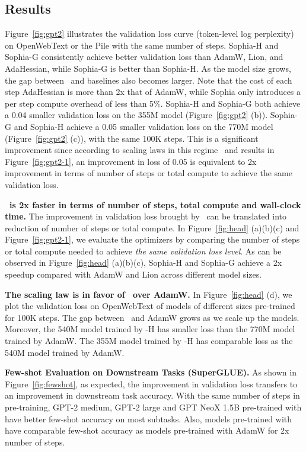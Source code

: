 \subsection{Results}\label{sec:results}

Figure~\ref{fig:gpt2} illustrates the validation loss curve (token-level log perplexity) on OpenWebText or the Pile with the same number of steps. Sophia-H and Sophia-G
consistently achieve better validation loss than AdamW, Lion, and AdaHessian, while Sophia-G is better than Sophia-H. As the model size grows, the gap between \ours~and baselines also becomes larger. Note that the cost of each step AdaHessian is more than 2x that of AdamW, while Sophia only introduces a per step compute overhead of less than 5$\%$. Sophia-H and Sophia-G both achieve a 0.04 smaller validation loss on the 355M model (Figure~\ref{fig:gpt2} (b)). Sophia-G and Sophia-H achieve a 0.05 smaller validation loss on the 770M model (Figure~\ref{fig:gpt2} (c)), with the same 100K steps. This is a significant improvement since according to scaling laws in this regime~\citep{kaplan2020scaling,hoffmann2022training} and results in Figure~\ref{fig:gpt2-1}, an improvement in loss of 0.05 is equivalent to 2x improvement in terms of number of steps or total compute to achieve the same validation loss. 

\textbf{\ours~is 2x faster in terms of number of steps, total compute and wall-clock time.} The improvement in validation loss brought by \ours~can be translated into reduction of number of steps or total compute. In Figure~\ref{fig:head} (a)(b)(c) and Figure~\ref{fig:gpt2-1}, we evaluate the optimizers by comparing the number of steps or total compute needed to achieve \textit{the same validation loss level}. As can be observed in Figure~\ref{fig:head} (a)(b)(c), Sophia-H and Sophia-G achieve a 2x speedup compared with AdamW and Lion across different model sizes. 



\textbf{The scaling law is in favor of \ours~over AdamW.} In Figure~\ref{fig:head} (d), we plot the validation loss on OpenWebText of models of different sizes pre-trained for 100K steps. The gap between \ours~and AdamW grows as we scale up the models. Moreover, the 540M model trained by \ours-H has smaller loss than the 770M model trained by AdamW. The 355M model trained by \ours-H has comparable loss as the 540M model trained by AdamW. 

\textbf{Few-shot Evaluation on Downstream Tasks (SuperGLUE).} As shown in Figure~\ref{fig:fewshot}, as expected, the improvement in validation loss transfers to an improvement in downstream task accuracy. 
With the same number of steps in pre-training, GPT-2 medium, GPT-2 large and GPT NeoX 1.5B pre-trained with {\ours} have better few-shot accuracy on most subtasks. Also, models pre-trained with {\ours} have comparable few-shot accuracy as models pre-trained with AdamW for 2x number of steps. 

